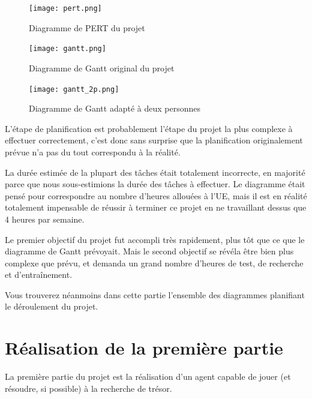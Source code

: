 \begin{figure}
\centering
\texttt{[image: pert.png]}
\caption{Diagramme de PERT du projet}
\end{figure}

\begin{figure}
\centering
\texttt{[image: gantt.png]}
\caption{Diagramme de Gantt original du projet}
\end{figure}

\begin{figure}
\centering
\texttt{[image: gantt\_2p.png]}
\caption{Diagramme de Gantt adapté à deux personnes}
\end{figure}

L'étape de planification est probablement l'étape du projet la plus complexe à effectuer correctement, c'est donc sans surprise que la planification originalement prévue n'a pas du tout correspondu à la réalité.
\par
La durée estimée de la plupart des tâches était totalement incorrecte, en majorité parce que nous sous-estimions la durée des tâches à effectuer. Le diagramme était pensé pour correspondre au nombre d'heures allouées à l'UE, mais il est en réalité totalement impensable de réussir à terminer ce projet en ne travaillant dessus que 4 heures par semaine.
\par
Le premier objectif du projet fut accompli très rapidement, plus tôt que ce que le diagramme de Gantt prévoyait. Mais le second objectif se révéla être bien plus complexe que prévu, et demanda un grand nombre d'heures de test, de recherche et d'entraînement.
\par
Vous trouverez néanmoins dans cette partie l'ensemble des diagrammes planifiant le déroulement du projet.

\FloatBarrier

\section{Réalisation de la première partie}

La première partie du projet est la réalisation d'un agent capable de jouer (et résoudre, si possible) à la recherche de trésor.

